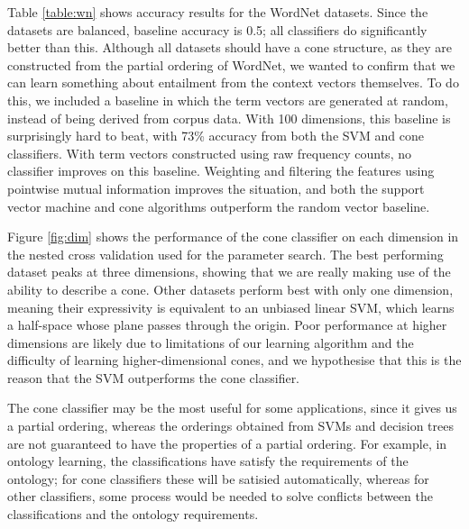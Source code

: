 Table \ref{table:wn} shows accuracy results for the WordNet
datasets. Since the datasets are balanced, baseline accuracy is 0.5;
all classifiers do significantly better than this. Although all
datasets should have a cone structure, as they are constructed from
the partial ordering of WordNet, we wanted to confirm that we can
learn something about entailment from the context vectors
themselves. To do this, we included a baseline in which the term
vectors are generated at random, instead of being derived from corpus
data. With 100 dimensions, this baseline is surprisingly hard to beat,
with 73\% accuracy from both the SVM and cone classifiers. With term
vectors constructed using raw frequency counts, no classifier improves
on this baseline. Weighting and filtering the features using pointwise
mutual information improves the situation, and both the support vector
machine and cone algorithms outperform the random vector baseline.

Figure \ref{fig:dim} shows the performance of the cone classifier on
each dimension in the nested cross validation used for the parameter
search. The best performing dataset peaks at three dimensions, showing
that we are really making use of the ability to describe a cone. Other
datasets perform best with only one dimension, meaning their
expressivity is equivalent to an unbiased linear SVM, which learns a
half-space whose plane passes through the origin. Poor performance at
higher dimensions are likely due to limitations of our learning
algorithm and the difficulty of learning higher-dimensional cones, and
we hypothesise that this is the reason that the SVM outperforms the
cone classifier.

The cone classifier may be the most useful for some applications,
since it gives us a partial ordering, whereas the orderings obtained
from SVMs and decision trees are not guaranteed to have the properties
of a partial ordering. For example, in ontology learning, the
classifications have satisfy the requirements of the ontology; for
cone classifiers these will be satisied automatically, whereas for
other classifiers, some process would be needed to solve conflicts
between the classifications and the ontology requirements.
